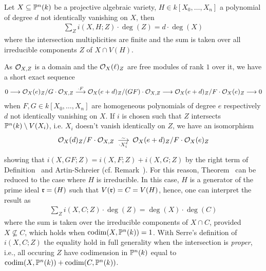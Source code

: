 \documentclass[a4paper,parskip=half,numbers=enddot, DIV=12]{scrreprt}
\begin{document}
\begin{thm} 
    Let $X\subseteq \mathbb{P}^n(k)$ be a projective algebraic variety, $H\in k[X_0,\ldots, X_n]$ a polynomial of degree $d$ not identically vanishing on $X$, then 
    \begin{align*}
        \sum_{Z} i(X,H;Z) \cdot \deg(Z) = d\cdot\deg (X)
    \end{align*}
    where the intersection multiplicities are finite and the sum is taken over all irreducible components $Z$ of $X\cap V(H)$.
\end{thm}
\begin{rem*}
    As $\mathcal{O}_{X,Z}$ is a domain and the $\mathcal{O}_X(\ell)_Z$ are free modules of rank $1$ over it, we have a short exact sequence
    \begin{align*}
        0\morphism \Oo_X(e)_Z/G\cdot \Oo_{X,Z} \morphism[\cdot F] \Oo_X(e+d)_Z/(GF)\cdot \Oo_{X,Z} \morphism \Oo_X(e+d)_Z/F\cdot \Oo_X(e)_Z \morphism 0
    \end{align*}
    when $F,G\in k[X_0,\ldots,X_n]$ are homogeneous polynomials of degree $e$ respectively $d$ not identically vanishing on $X$. If $i$ is chosen such that $Z$ intersects $\mathbb{P}^n(k)\setminus V(X_i)$, i.e. $X_i$ doesn't vanish identically on $Z$, we have an isomorphism
    \begin{align*}
        \Oo_X(d)_Z/ F\cdot \Oo_{X,Z} \isomorphism[\cdot X_i^e] \Oo_X(e+d)_Z/F\cdot \Oo_X(e)_Z
    \end{align*}
    showing that $i(X, GF; Z) = i(X,F;Z)+i(X,G;Z)$ by the right term of Definition~ and Artin-Schreier (cf. Remark~). For this reason, Theorem~ can be reduced to the case where $H$ is irreducible. In this case, $H$ is a generator of the prime ideal $\mathfrak{r}=(H)$ such that $V(\mathfrak{r}) = C = V(H)$, hence, one can interpret the result as
    \begin{align*}
        \sum_Z i(X,C;Z) \cdot \deg (Z) = \deg(X)\cdot \deg(C)
    \end{align*}
    where the sum is taken over the irreducible components of $X\cap C$, provided $X\not \subseteq C$, which holds when $\operatorname{codim}(X,\mathbb{P}^n(k)) = 1$. With Serre's definition of $i(X,C;Z)$ the equality hold in full generality when the intersection is \emph{proper}, i.e., all occuring $Z$ have codimension in $\mathbb{P}^n(k)$ equal to $\operatorname{codim} (X,\mathbb{P}^n(k)) +\operatorname{codim}(C, \mathbb{P}^n(k))$.
    

\end{rem*}
\end{document}
